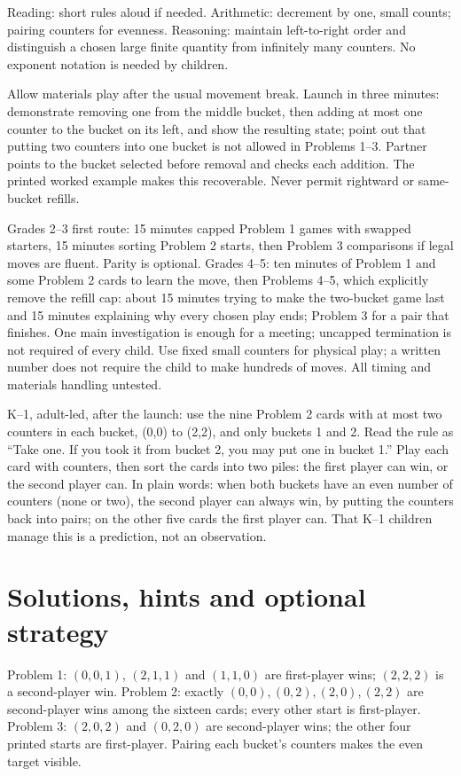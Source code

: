 \documentclass[11pt,letterpaper]{article}
\begin{document}
Reading: short rules aloud if needed. Arithmetic: decrement by one, small counts; pairing counters for evenness. Reasoning: maintain left-to-right order and distinguish a chosen large finite quantity from infinitely many counters. No exponent notation is needed by children.

Allow materials play after the usual movement break. Launch in three minutes: demonstrate removing one from the middle bucket, then adding at most one counter to the bucket on its left, and show the resulting state; point out that putting two counters into one bucket is not allowed in Problems 1--3. Partner points to the bucket selected before removal and checks each addition. The printed worked example makes this recoverable. Never permit rightward or same-bucket refills.

Grades 2--3 first route: 15 minutes capped Problem 1 games with swapped starters, 15 minutes sorting Problem 2 starts, then Problem 3 comparisons if legal moves are fluent. Parity is optional. Grades 4--5: ten minutes of Problem 1 and some Problem 2 cards to learn the move, then Problems 4--5, which explicitly remove the refill cap: about 15 minutes trying to make the two-bucket game last and 15 minutes explaining why every chosen play ends; Problem 3 for a pair that finishes. One main investigation is enough for a meeting; uncapped termination is not required of every child. Use fixed small counters for physical play; a written number does not require the child to make hundreds of moves. All timing and materials handling untested.

K--1, adult-led, after the launch: use the nine Problem 2 cards with at most two counters in each bucket, (0,0) to (2,2), and only buckets 1 and 2. Read the rule as ``Take one. If you took it from bucket 2, you may put one in bucket 1.'' Play each card with counters, then sort the cards into two piles: the first player can win, or the second player can. In plain words: when both buckets have an even number of counters (none or two), the second player can always win, by putting the counters back into pairs; on the other five cards the first player can. That K--1 children manage this is a prediction, not an observation.
\newpage
\section*{Solutions, hints and optional strategy}
Problem 1: $(0,0,1)$, $(2,1,1)$ and $(1,1,0)$ are first-player wins; $(2,2,2)$ is a second-player win. Problem 2: exactly $(0,0),(0,2),(2,0),(2,2)$ are second-player wins among the sixteen cards; every other start is first-player. Problem 3: $(2,0,2)$ and $(0,2,0)$ are second-player wins; the other four printed starts are first-player. Pairing each bucket's counters makes the even target visible.
\end{document}
